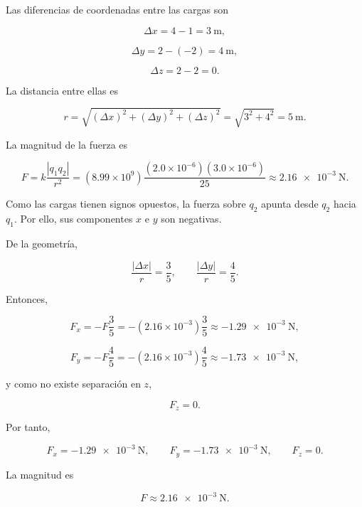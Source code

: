 \begin{explicacion}
Las diferencias de coordenadas entre las cargas son

\[
\Delta x=4-1=\SI{3}{\metre},
\]

\[
\Delta y=2-(-2)=\SI{4}{\metre},
\]

\[
\Delta z=2-2=0.
\]

La distancia entre ellas es

\[
r=\sqrt{(\Delta x)^2+(\Delta y)^2+(\Delta z)^2}
=\sqrt{3^2+4^2}
=\SI{5}{\metre}.
\]

La magnitud de la fuerza es

\[
F=k\frac{|q_1q_2|}{r^2}
=(8.99\times10^9)
\frac{(2.0\times10^{-6})(3.0\times10^{-6})}{25}
\approx\SI{2.16e-3}{\newton}.
\]

Como las cargas tienen signos opuestos, la fuerza sobre \(q_2\) apunta desde
\(q_2\) hacia \(q_1\). Por ello, sus componentes \(x\) e \(y\) son negativas.

De la geometría,

\[
\frac{|\Delta x|}{r}=\frac35, \qquad
\frac{|\Delta y|}{r}=\frac45.
\]

Entonces,

\[
F_x=-F\frac{3}{5}
=-(2.16\times10^{-3})\frac35
\approx-\SI{1.29e-3}{\newton},
\]

\[
F_y=-F\frac{4}{5}
=-(2.16\times10^{-3})\frac45
\approx-\SI{1.73e-3}{\newton},
\]

y como no existe separación en \(z\),

\[
F_z=0.
\]

Por tanto,

\[
\boxed{F_x=-\SI{1.29e-3}{\newton}}, \qquad
\boxed{F_y=-\SI{1.73e-3}{\newton}}, \qquad
\boxed{F_z=0}.
\]

La magnitud es

\[
\boxed{F\approx\SI{2.16e-3}{\newton}}.
\]
\end{explicacion}